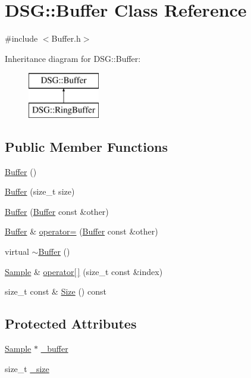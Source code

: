 \hypertarget{classDSG_1_1Buffer}{\section{D\+S\+G\+:\+:Buffer Class Reference}
\label{classDSG_1_1Buffer}
}


{\ttfamily \#include $<$Buffer.\+h$>$}

Inheritance diagram for D\+S\+G\+:\+:Buffer\+:\begin{figure}[H]
\begin{center}
\leavevmode
\includegraphics[height=2.000000cm]{classDSG_1_1Buffer}
\end{center}
\end{figure}
\subsection*{Public Member Functions}
\begin{DoxyCompactItemize}
\item 
\hyperlink{classDSG_1_1Buffer_aa764dd8c389dcff51de08cb81fafeb86}{Buffer} ()
\item 
\hyperlink{classDSG_1_1Buffer_a0e6502fd61833043744f9df94e8d5111}{Buffer} (size\+\_\+t size)
\item 
\hyperlink{classDSG_1_1Buffer_a468a65d70553dfb773e4592b4b077683}{Buffer} (\hyperlink{classDSG_1_1Buffer}{Buffer} const \&other)
\item 
\hyperlink{classDSG_1_1Buffer}{Buffer} \& \hyperlink{classDSG_1_1Buffer_a977d572a7d402ff6bf991d7c5c0cc6a7}{operator=} (\hyperlink{classDSG_1_1Buffer}{Buffer} const \&other)
\item 
virtual \hyperlink{classDSG_1_1Buffer_a619fc41bf263a419da1a19254e194101}{$\sim$\+Buffer} ()
\item 
\hyperlink{classDSG_1_1Sample}{Sample} \& \hyperlink{classDSG_1_1Buffer_a5dafe5522f3d20756f83e08499e8eaeb}{operator\mbox{[}$\,$\mbox{]}} (size\+\_\+t const \&index)
\item 
size\+\_\+t const \& \hyperlink{classDSG_1_1Buffer_a4acea659d9cd0be652ec55d21e5b0262}{Size} () const 
\end{DoxyCompactItemize}
\subsection*{Protected Attributes}
\begin{DoxyCompactItemize}
\item 
\hyperlink{classDSG_1_1Sample}{Sample} $\ast$ \hyperlink{classDSG_1_1Buffer_a6506d4763401650acb463cb5d4913e31}{\+\_\+buffer}
\item 
size\+\_\+t \hyperlink{classDSG_1_1Buffer_a4e2fef9ed617af2554b25c999def8f71}{\+\_\+size}
\end{DoxyCompactItemize}


